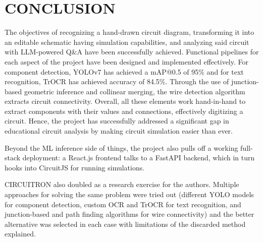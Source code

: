 \chapter{CONCLUSION}

The objectives of recognizing a hand-drawn circuit diagram, transforming it into an editable schematic having simulation capabilities, and analyzing said circuit with LLM-powered Q\&A have been successfully achieved. Functional pipelines for each aspect of the project have been designed and implemented effectively. For component detection, YOLOv7 has achieved a mAP@0.5 of 95\% and for text recognition, TrOCR has achieved accuracy of 84.5\%. Through the use of junction-based geometric inference and collinear merging, the wire detection algorithm extracts circuit connectivity. Overall, all these elements work hand-in-hand to extract components with their values and connections, effectively digitizing a circuit. Hence, the project has successfully addressed a significant gap in educational circuit analysis by making circuit simulation easier than ever.

Beyond the ML inference side of things, the project also pulls off a working full-stack deployment: a React.js frontend talks to a FastAPI backend, which in turn hooks into CircuitJS for running simulations.

CIRCUITRON also doubled as a research exercise for the authors. Multiple approaches for solving the same problem were tried out (different YOLO models for component detection, custom OCR and TrOCR for text recognition, and junction-based and path finding algorithms for wire connectivity) and the better alternative was selected in each case with limitations of the discarded method explained.
 
